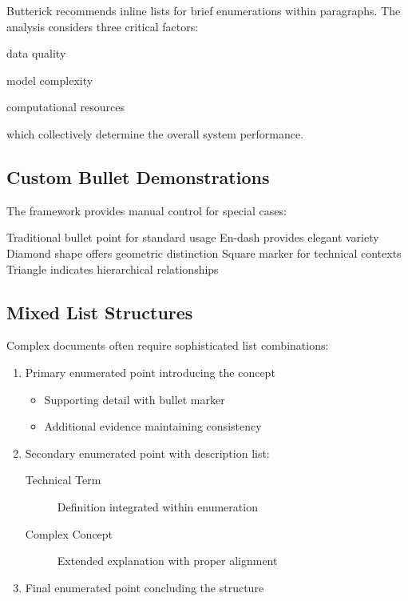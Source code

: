 \documentclass[11pt,letterpaper]{article}
\begin{document}
Butterick recommends inline lists for brief enumerations within paragraphs. The analysis considers three critical factors: \begin{inlineitem}\item data quality\item model complexity\item computational resources\end{inlineitem} which collectively determine the overall system performance.

\subsection{Custom Bullet Demonstrations}

The framework provides manual control for special cases:

\begin{itemize}
\itembullet Traditional bullet point for standard usage
\itemdash En-dash provides elegant variety  
\itemdiamond Diamond shape offers geometric distinction
\itemsquare Square marker for technical contexts
\itemtriangle Triangle indicates hierarchical relationships
\end{itemize}

\subsection{Mixed List Structures}

Complex documents often require sophisticated list combinations:

\begin{enumerate}
\item Primary enumerated point introducing the concept
  \begin{itemize}
  \item Supporting detail with bullet marker
  \item Additional evidence maintaining consistency
  \end{itemize}
\item Secondary enumerated point with description list:
  \begin{description}
  \item[Technical Term] Definition integrated within enumeration
  \item[Complex Concept] Extended explanation with proper alignment
  \end{description}
\item Final enumerated point concluding the structure
\end{enumerate}
\end{document}

